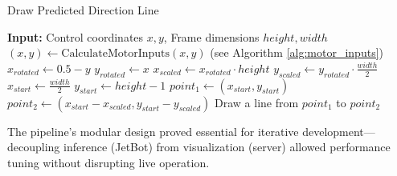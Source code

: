 \begin{algorithm}[H]
  \caption{Draw Predicted Direction Line}
  \begin{algorithmic}[1]
    \State \textbf{Input:} Control coordinates $x, y$, Frame dimensions $height, width$
    \State $(x, y) \gets \text{CalculateMotorInputs}(x, y)$ (see Algorithm \ref{alg:motor_inputs})
    \State $x_{rotated} \gets 0.5 - y$
    \State $y_{rotated} \gets x$
    \State $x_{scaled} \gets x_{rotated} \cdot height$
    \State $y_{scaled} \gets y_{rotated} \cdot \frac{width}{2}$
    \State $x_{start} \gets \frac{width}{2}$
    \State $y_{start} \gets height - 1$
    \State $point_1 \gets (x_{start}, y_{start})$
    \State $point_2 \gets (x_{start} - x_{scaled}, y_{start} - y_{scaled})$
    \State Draw a line from $point_1$ to $point_2$
  \end{algorithmic}
  \label{alg:draw_line}
\end{algorithm}

The pipeline’s modular design proved essential for iterative development—decoupling inference (JetBot) from visualization (server) allowed performance tuning without disrupting live operation.